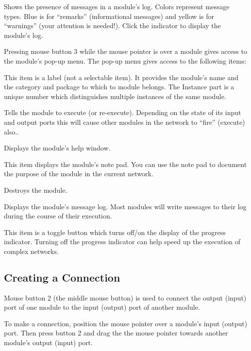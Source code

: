 \begin{description}
   Shows the presence of messages in a
  module's log.  Colors represent message types.  Blue is for
  ``remarks'' (informational messages) and yellow is for ``warnings''
  (your attention is needed!).  Click the indicator to display the
  module's log.

 Pressing mouse button 3 while the mouse
  pointer is over a module gives access to the module's pop-up menu.  The
  pop-up menu gives access to the following items:
  \begin{description}
     This item is a
    label (not a selectable item).  It provides the module's name and
    the category and package to which to module belongs.  The Instance
    part is a unique number which distinguishes multiple instances of
    the same module.

     Tells the module to
    execute (or re-execute).  Depending on the state of its input and
    output ports this will cause other modules in the network to
    ``fire'' (execute) also..

     Displays the module's help window.
    
     This item displays the module's note pad.
    You can use the note pad to document the purpose of the module in
    the current network.

     Destroys the module.
    
     Displays the module's message log.  Most
    modules will write messages to their log during the course of
    their execution.
    
     This item is a toggle button which
    turns off/on the display of the progress indicator.  Turning off
    the progress indicator can help speed up the execution of complex
    networks.
  \end{description}
\end{description}


\subsection{Creating a Connection}
\label{sec:connectmods}

Mouse button 2 (the middle mouse button) is used to connect the output
(input) port of one module to the input (output) port of another
module.

To make a connection, position the mouse pointer over a module's input
(output) port.  Then press button 2 and drag the the mouse pointer towards
another module's output (input) port.

